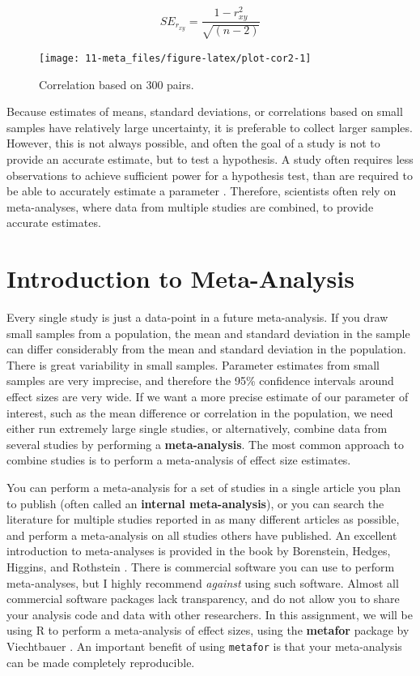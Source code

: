 \documentclass[
  oneside]{book}
\begin{document}
\[SE_{r_{xy}} = \frac{1 - r^2_{xy}}{\sqrt{(n - 2)}}\]

\begin{figure}

{\centering \texttt{[image: 11-meta\_files/figure-latex/plot-cor2-1]} 

}

\caption{Correlation based on 300 pairs.}\label{fig:plot-cor2}
\end{figure}

Because estimates of means, standard deviations, or correlations based on small samples have relatively large uncertainty, it is preferable to collect larger samples. However, this is not always possible, and often the goal of a study is not to provide an accurate estimate, but to test a hypothesis. A study often requires less observations to achieve sufficient power for a hypothesis test, than are required to be able to accurately estimate a parameter \citep{maxwell_sample_2008}. Therefore, scientists often rely on meta-analyses, where data from multiple studies are combined, to provide accurate estimates.

\hypertarget{introduction-to-meta-analysis}{%
\section{Introduction to Meta-Analysis}\label{introduction-to-meta-analysis}}

Every single study is just a data-point in a future meta-analysis. If you draw small samples from a population, the mean and standard deviation in the sample can differ considerably from the mean and standard deviation in the population. There is great variability in small samples. Parameter estimates from small samples are very imprecise, and therefore the 95\% confidence intervals around effect sizes are very wide. If we want a more precise estimate of our parameter of interest, such as the mean difference or correlation in the population, we need either run extremely large single studies, or alternatively, combine data from several studies by performing a \textbf{meta-analysis}. The most common approach to combine studies is to perform a meta-analysis of effect size estimates.

You can perform a meta-analysis for a set of studies in a single article you plan to publish (often called an \textbf{internal meta-analysis}), or you can search the literature for multiple studies reported in as many different articles as possible, and perform a meta-analysis on all studies others have published. An excellent introduction to meta-analyses is provided in the book by Borenstein, Hedges, Higgins, and Rothstein \citet{borenstein_introduction_2009}. There is commercial software you can use to perform meta-analyses, but I highly recommend \emph{against} using such software. Almost all commercial software packages lack transparency, and do not allow you to share your analysis code and data with other researchers. In this assignment, we will be using R to perform a meta-analysis of effect sizes, using the \textbf{metafor} package by Viechtbauer \citeyearpar{viechtbauer_conducting_2010}. An important benefit of using \texttt{metafor} is that your meta-analysis can be made completely reproducible.
\end{document}
